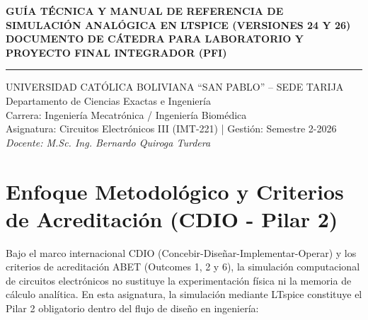 \documentclass[11pt, a4paper]{article}
\begin{document}
\begin{center}
    {\LARGE \textbf{GUÍA TÉCNICA Y MANUAL DE REFERENCIA DE SIMULACIÓN ANALÓGICA EN LTSPICE (VERSIONES 24 Y 26)}}\\[0.3cm]
    {\large \textbf{DOCUMENTO DE CÁTEDRA PARA LABORATORIO Y PROYECTO FINAL INTEGRADOR (PFI)}}\\
    \vspace{0.4cm}
    \hrule
    \vspace{0.4cm}
    {\large UNIVERSIDAD CATÓLICA BOLIVIANA ``SAN PABLO'' -- SEDE TARIJA}\\[0.1cm]
    Departamento de Ciencias Exactas e Ingeniería\\[0.1cm]
    Carrera: Ingeniería Mecatrónica / Ingeniería Biomédica\\[0.1cm]
    Asignatura: Circuitos Electrónicos III (IMT-221) | Gestión: Semestre 2-2026\\[0.1cm]
    \textit{Docente: M.Sc. Ing. Bernardo Quiroga Turdera}
\end{center}

\vspace{0.5cm}

\section{Enfoque Metodológico y Criterios de Acreditación (CDIO - Pilar 2)}

Bajo el marco internacional CDIO (Concebir-Diseñar-Implementar-Operar) y los criterios de acreditación ABET (Outcomes 1, 2 y 6), la simulación computacional de circuitos electrónicos no sustituye la experimentación física ni la memoria de cálculo analítica. En esta asignatura, la simulación mediante LTspice constituye el Pilar 2 obligatorio dentro del flujo de diseño en ingeniería:
\end{document}
